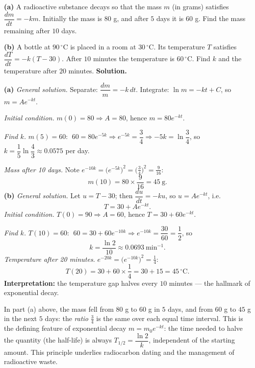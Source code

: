 \documentclass[11pt]{article}
\newcommand{\cle}[1]{{\popxbold\color{popdark}#1}}
\begin{document}
\begin{exoresolu}
\textbf{(a)} A radioactive substance decays so that the mass $m$ (in grams) satisfies $\dfrac{dm}{dt} = -km$. Initially the mass is $80$ g, and after $5$ days it is $60$ g. Find the mass remaining after $10$ days.\par
\textbf{(b)} A bottle at $90\,^{\circ}$C is placed in a room at $30\,^{\circ}$C. Its temperature $T$ satisfies $\dfrac{dT}{dt} = -k(T - 30)$. After $10$ minutes the temperature is $60\,^{\circ}$C. Find $k$ and the temperature after $20$ minutes.
\tcblower
\textbf{Solution.}\par
\textbf{(a)} \emph{General solution.} Separate: $\dfrac{dm}{m} = -k\,dt$. Integrate: $\ln m = -kt + C$, so $m = Ae^{-kt}$.\par
\emph{Initial condition.} $m(0) = 80 \Rightarrow A = 80$, hence $m = 80e^{-kt}$.\par
\emph{Find $k$.} $m(5) = 60$: $\;60 = 80e^{-5k} \Rightarrow e^{-5k} = \dfrac{3}{4} \Rightarrow -5k = \ln\dfrac{3}{4}$, so $k = \dfrac{1}{5}\ln\dfrac{4}{3} \approx 0.0575$ per day.\par
\emph{Mass after 10 days.} Note $e^{-10k} = \bigl(e^{-5k}\bigr)^2 = \bigl(\tfrac34\bigr)^2 = \tfrac{9}{16}$:
\[ m(10) = 80 \times \frac{9}{16} = 45\ \text{g}. \]
\textbf{(b)} \emph{General solution.} Let $u = T - 30$; then $\dfrac{du}{dt} = -ku$, so $u = Ae^{-kt}$, i.e.
\[ T = 30 + Ae^{-kt}. \]
\emph{Initial condition.} $T(0) = 90 \Rightarrow A = 60$, hence $T = 30 + 60e^{-kt}$.\par
\emph{Find $k$.} $T(10) = 60$: $\;60 = 30 + 60e^{-10k} \Rightarrow e^{-10k} = \dfrac{30}{60} = \dfrac12$, so
\[ k = \frac{\ln 2}{10} \approx 0.0693\ \text{min}^{-1}. \]
\emph{Temperature after 20 minutes.} $e^{-20k} = \bigl(e^{-10k}\bigr)^2 = \tfrac14$:
\[ T(20) = 30 + 60 \times \frac{1}{4} = 30 + 15 = 45\,^{\circ}\mathrm{C}. \]
\textbf{Interpretation:} the temperature gap halves every $10$ minutes — the hallmark of exponential decay.
\end{exoresolu}

\begin{savaistu}
In part (a) above, the mass fell from $80$ g to $60$ g in $5$ days, and from $60$ g to $45$ g in the next $5$ days: the \emph{ratio} $\tfrac34$ is the same over each equal time interval. This is the defining feature of exponential decay $m = m_0 e^{-kt}$: the time needed to halve the quantity (the \cle{half-life}) is always $T_{1/2} = \dfrac{\ln 2}{k}$, independent of the starting amount. This principle underlies radiocarbon dating and the management of radioactive waste.
\end{savaistu}
\end{document}
